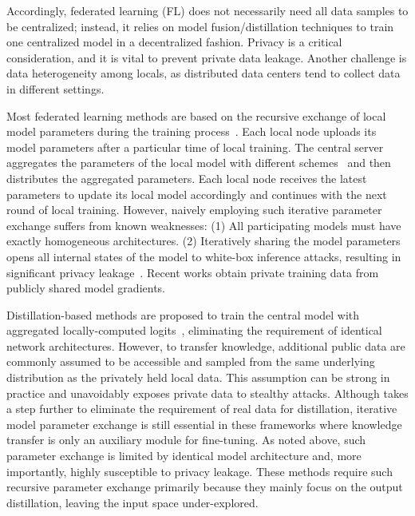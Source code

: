 \documentclass[letterpaper]{article} %
\begin{document}
Accordingly, federated learning (FL) does not necessarily need all data samples to be centralized; instead, it relies on model fusion/distillation techniques to train one centralized model in a decentralized fashion. Privacy is a critical consideration, and it is vital to prevent private data leakage. Another challenge is data heterogeneity among locals, as distributed data centers tend to collect data in different settings. 

Most federated learning methods are based on the recursive exchange of local model parameters during the training process~\cite{mcmahan2017communication, li2018federated, karimireddy2019scaffold}. Each local node uploads its model parameters after a particular time of local training. The central server aggregates the parameters of the local model with different schemes~\cite{wang2020federated, li2019fair, hsu2020federated} and then distributes the aggregated parameters. Each local node receives the latest parameters to update its local model accordingly and continues with the next round of local training. 
However, naively employing such iterative parameter exchange suffers from known weaknesses: (1) All participating models must have exactly homogeneous architectures. (2) Iteratively sharing the model parameters opens all internal states of the model to white-box inference attacks, resulting in significant privacy leakage~\cite{chang2019cronus}. Recent works \cite{zhu2019deep, geiping2020inverting} obtain private training data from publicly shared model gradients. 





Distillation-based methods are proposed to train the central model with aggregated locally-computed logits~\cite{li2019fedmd, lin2020ensemble, gong2022preserving}, eliminating the requirement of identical network architectures. %
However, to transfer knowledge, additional public data are commonly assumed to be accessible and sampled from the same underlying distribution as the privately held local data. 
This assumption can be strong in practice and unavoidably exposes private data to stealthy attacks. %
Although \cite{zhu2021data, zhang2022fedzkt, zhang2022fine} takes a step further to eliminate the requirement of real data for distillation, iterative model parameter exchange is still essential in these frameworks where knowledge transfer is only an auxiliary module for fine-tuning. As noted above, such parameter exchange is limited by identical model architecture and, more importantly, highly susceptible to privacy leakage. 
These methods require such recursive parameter exchange primarily because they mainly focus on the output distillation, leaving the input space under-explored. 
\end{document}
